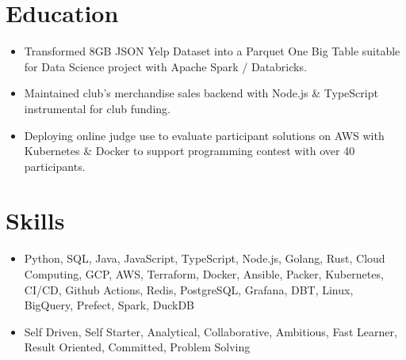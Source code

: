 \section{Education}
\begin{itemize}
  \item Transformed 8GB JSON Yelp Dataset into a Parquet One Big Table suitable for Data Science project with Apache Spark / Databricks.
  \item Maintained club's merchandise sales backend with Node.js \& TypeScript instrumental for club funding.
\end{itemize}
\begin{itemize}
  \item Deploying online judge use to evaluate participant solutions on AWS with Kubernetes \& Docker to support programming contest with over 40 participants. 
\end{itemize}
  
\section{Skills}
\begin{itemize}
  \item Python, SQL, Java, JavaScript, TypeScript, Node.js, Golang, Rust, Cloud Computing, GCP, AWS, Terraform, Docker, Ansible, Packer, Kubernetes, CI/CD, Github Actions, Redis, PostgreSQL, Grafana, DBT, Linux, BigQuery, Prefect, Spark, DuckDB
  \item Self Driven, Self Starter, Analytical, Collaborative, Ambitious, Fast Learner, Result Oriented, Committed, Problem Solving
\end{itemize}
